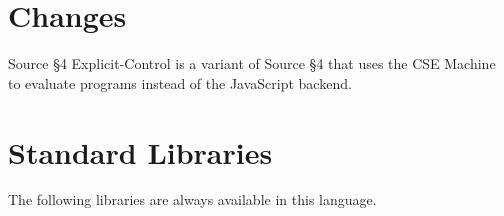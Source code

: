 





\section{Changes}




Source \S 4 Explicit-Control is a variant of Source \S 4 that uses the CSE Machine to evaluate programs instead of the JavaScript backend.





\newpage





















\section{Standard Libraries}

The following libraries are always available in this language.



















\newpage



\newpage



    

